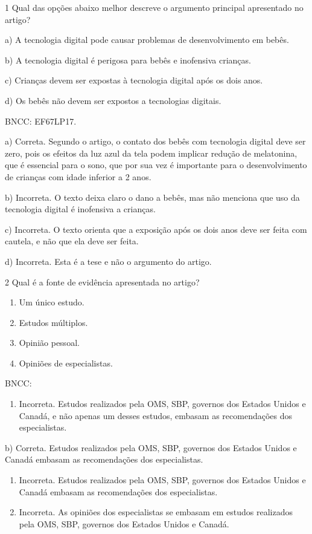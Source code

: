 {\num{1} Qual das opções abaixo melhor descreve o argumento principal
apresentado no artigo?

a) A tecnologia digital pode causar problemas de desenvolvimento em
bebês.

b) A tecnologia digital é perigosa para bebês e inofensiva crianças.

c) Crianças devem ser expostas à tecnologia digital após os dois anos.

d) Os bebês não devem ser expostos a tecnologias digitais.

BNCC: EF67LP17.

a) Correta. Segundo o artigo, o contato dos bebês com tecnologia digital
deve ser zero, pois os efeitos da luz azul da tela podem implicar
redução de melatonina, que é essencial para o sono, que por sua vez é
importante para o desenvolvimento de crianças com idade inferior a 2
anos.

b) Incorreta. O texto deixa claro o dano a bebês, mas não menciona que
uso da tecnologia digital é inofensiva a crianças.

c) Incorreta. O texto orienta que a exposição após os dois anos deve ser
feita com cautela, e não que ela deve ser feita.

d) Incorreta. Esta é a tese e não o argumento do artigo.

\num{2} Qual é a fonte de evidência apresentada no artigo?

\begin{enumerate}
\def\labelenumi{\alph{enumi})}
\item
  Um único estudo.
\item
  Estudos múltiplos.
\item
  Opinião pessoal.
\item
  Opiniões de especialistas.
\end{enumerate}

BNCC:

\begin{enumerate}
\def\labelenumi{\alph{enumi})}
\tightlist
\item
  Incorreta. Estudos realizados pela OMS, SBP, governos dos Estados
  Unidos e Canadá, e não apenas um desses estudos, embasam as
  recomendações dos especialistas.
\end{enumerate}

b) Correta. Estudos realizados pela OMS, SBP, governos dos Estados
Unidos e Canadá embasam as recomendações dos especialistas.

\begin{enumerate}
\def\labelenumi{\alph{enumi})}
\setcounter{enumi}{2}
\item
  Incorreta. Estudos realizados pela OMS, SBP, governos dos Estados
  Unidos e Canadá embasam as recomendações dos especialistas.
\item
  Incorreta. As opiniões dos especialistas se embasam em estudos
  realizados pela OMS, SBP, governos dos Estados Unidos e Canadá.
\end{enumerate}

}
